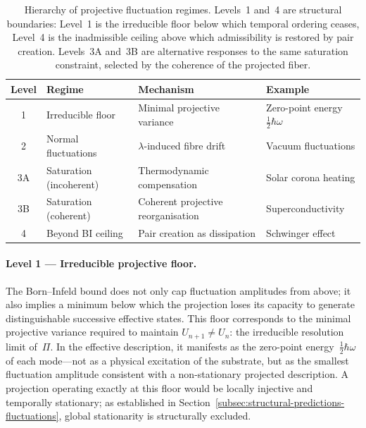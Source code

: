   \begin{table}[ht]
    \centering
    \begin{tabular}{clll}
      \hline
      \textbf{Level} & \textbf{Regime}         & \textbf{Mechanism}                 & \textbf{Example}
      \\
      \hline
      1              & Irreducible floor       & Minimal projective variance        & Zero-point energy
      $\tfrac{1}{2}\hbar\omega$ \\
      2              & Normal fluctuations     & $\lambda$-induced fibre drift      & Vacuum fluctuations
      \\
      3A             & Saturation (incoherent) & Thermodynamic compensation         & Solar corona heating
      \\
      3B             & Saturation (coherent)   & Coherent projective reorganisation & Superconductivity
      \\
      4              & Beyond BI ceiling       & Pair creation as dissipation       & Schwinger effect
      \\
      \hline
    \end{tabular}
    \caption{Hierarchy of projective fluctuation regimes.
    Levels~1 and~4 are structural boundaries: Level~1 is the irreducible floor below
    which temporal ordering ceases, Level~4 is the inadmissible ceiling above which
    admissibility is restored by pair creation.
    Levels~3A and~3B are alternative responses to the same saturation constraint,
      selected by the coherence of the projected fiber.}
    \label{tab:fluctuation-hierarchy}
  \end{table}

  \paragraph{Level 1 --- Irreducible projective floor.}

    The Born--Infeld bound does not only cap fluctuation amplitudes from above; it also
    implies a minimum below which the projection loses its capacity to generate
    distinguishable successive effective states.
    This floor corresponds to the minimal projective variance required to maintain
    $U_{n+1} \neq U_n$: the irreducible resolution limit of~$\Pi$.
    In the effective description, it manifests as the zero-point energy~$\tfrac{1}{2}\hbar\omega$
    of each mode---not as a physical excitation of the substrate, but as the smallest
    fluctuation amplitude consistent with a non-stationary projected description.
    A projection operating exactly at this floor would be locally injective and temporally
    stationary; as established in Section~\ref{subsec:structural-predictions-fluctuations},
    global stationarity is structurally excluded.

